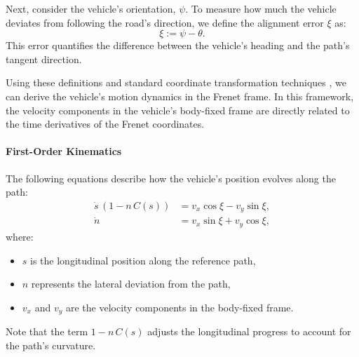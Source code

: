 Next, consider the vehicle's orientation, \(\psi\).
To measure how much the vehicle deviates from following the road's direction, we define the alignment error \(\xi\) as:
\begin{equation}
	\xi := \psi - \theta.
\end{equation}
This error quantifies the difference between the vehicle's heading and the path's tangent direction.

Using these definitions and standard coordinate transformation techniques \cite{eilbrecht_challenges_2020}, we can derive the vehicle's motion
dynamics in the Frenet frame.
In this framework, the velocity components in the vehicle's body-fixed frame are directly related to the time derivatives of the Frenet coordinates.

\paragraph{First-Order Kinematics}\label{par:first_order_kinematics}
The following equations describe how the vehicle's position evolves along the path:
\begin{align}
	\dot{s}\,(1 - n\,C(s)) & = v_x\cos{\xi} - v_y\sin{\xi}, \label{eq:first_derivative_long} \\
	\dot{n}                & = v_x\sin{\xi} + v_y\cos{\xi}, \label{eq:first_derivative_lat}
\end{align}
where:
\begin{itemize}
	\item \(s\) is the longitudinal position along the reference path,
	\item \(n\) represents the lateral deviation from the path,
	\item \(v_x\) and \(v_y\) are the velocity components in the body-fixed frame.
\end{itemize}
Note that the term \(1 - n\,C(s)\) adjusts the longitudinal progress to account for the path's curvature.

